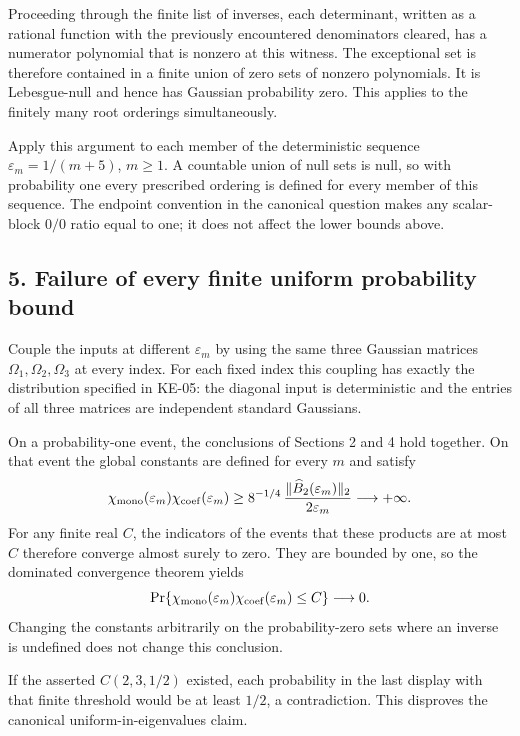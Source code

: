 \documentclass[10pt,a4paper]{article}
\begin{document}
Proceeding through the finite list of inverses, each determinant, written as a rational function with the previously encountered denominators cleared, has a numerator polynomial that is nonzero at this witness. The exceptional set is therefore contained in a finite union of zero sets of nonzero polynomials. It is Lebesgue-null and hence has Gaussian probability zero. This applies to the finitely many root orderings simultaneously.

Apply this argument to each member of the deterministic sequence \(\varepsilon_m=1/(m+5)\), \(m\geq1\). A countable union of null sets is null, so with probability one every prescribed ordering is defined for every member of this sequence. The endpoint convention in the canonical question makes any scalar-block \(0/0\) ratio equal to one; it does not affect the lower bounds above.

\subsection{5. Failure of every finite uniform probability bound}\label{failure-of-every-finite-uniform-probability-bound}

Couple the inputs at different \(\varepsilon_m\) by using the same three Gaussian matrices \(\Omega_1,\Omega_2,\Omega_3\) at every index. For each fixed index this coupling has exactly the distribution specified in KE-05: the diagonal input is deterministic and the entries of all three matrices are independent standard Gaussians.

On a probability-one event, the conclusions of Sections 2 and 4 hold together. On that event the global constants are defined for every \(m\) and satisfy \nopagebreak[3]
\[
\chi_{\rm mono}(\varepsilon_m)\chi_{\rm coef}(\varepsilon_m)
\geq
8^{-1/4}\,
\frac{\|\widehat B_2(\varepsilon_m)\|_2}{2\varepsilon_m}
\longrightarrow+\infty.
\] For any finite real \(C\), the indicators of the events that these products are at most \(C\) therefore converge almost surely to zero. They are bounded by one, so the dominated convergence theorem yields \nopagebreak[3]
\[
\Pr\!\left\{
\chi_{\rm mono}(\varepsilon_m)\chi_{\rm coef}(\varepsilon_m)\leq C
\right\}\longrightarrow0.
\] Changing the constants arbitrarily on the probability-zero sets where an inverse is undefined does not change this conclusion.

If the asserted \(C(2,3,1/2)\) existed, each probability in the last display with that finite threshold would be at least \(1/2\), a contradiction. This disproves the canonical uniform-in-eigenvalues claim.
\end{document}
